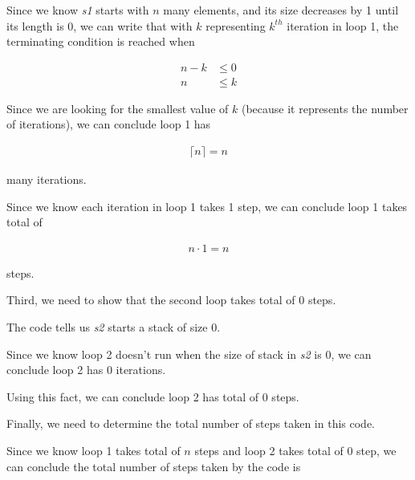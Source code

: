\documentclass[12pt]{article}
\begin{document}
\begin{enumerate}[a.]
    \bigskip

    Since we know \textit{s1} starts with $n$ many elements, and its size decreases
    by 1 until its length is 0, we can write that with $k$ representing
    $k^{th}$ iteration in loop 1, the terminating condition is reached when

    \setcounter{equation}{0}
    \begin{align}
        n - k &\leq 0\\
        n &\leq k
    \end{align}

    \bigskip

    Since we are looking for the smallest value of $k$ (because it represents
    the number of iterations), we can conclude loop 1 has

    \begin{align}
        \lceil n \rceil = n
    \end{align}

    many iterations.

    \bigskip

    Since we know each iteration in loop 1 takes 1 step, we can conclude
    loop 1 takes total of

    \begin{align}
        n \cdot 1 = n
    \end{align}

    steps.

    \bigskip

    Third, we need to show that the second loop takes total of 0 steps.

    \bigskip

    The code tells us \textit{s2} starts a stack of size 0.

    \bigskip

    Since we know loop 2 doesn't run when the size of stack in \textit{s2} is 0,
    we can conclude loop 2 has 0 iterations.

    \bigskip

    Using this fact, we can conclude loop 2 has total of 0 steps.

    \bigskip

    Finally, we need to determine the total number of steps taken in this code.

    \bigskip

    Since we know loop 1 takes total of $n$ steps and loop 2 takes total of 0 step, we can
    conclude the total number of steps taken by the code is


\end{enumerate}
\end{document}
